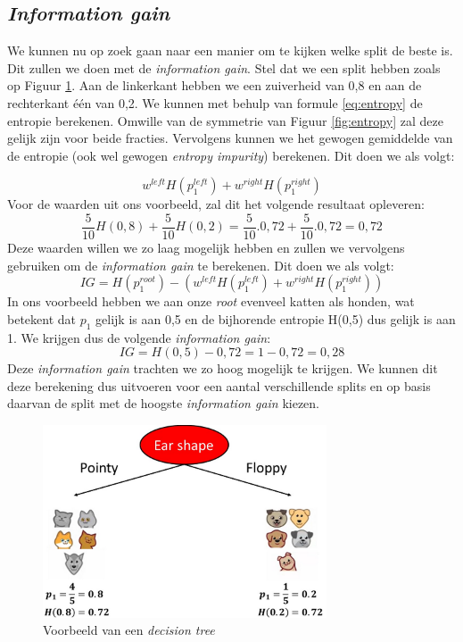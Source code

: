 \subsection{\textit{Information gain}}

We kunnen nu op zoek gaan naar een manier om te kijken welke split de beste is. Dit zullen we doen met de \textit{information gain}. Stel dat we een split hebben zoals op Figuur \ref{fig:decision-tree-split}. Aan de linkerkant hebben we een zuiverheid van 0,8 en aan de rechterkant één van 0,2. We kunnen met behulp van formule \ref{eq:entropy} de entropie berekenen. Omwille van de symmetrie van Figuur \ref{fig:entropy} zal deze gelijk zijn voor beide fracties. Vervolgens kunnen we het gewogen gemiddelde van de entropie (ook wel gewogen \textit{entropy impurity}) berekenen. Dit doen we als volgt:

\begin{equation}
	w^{left} H(p_{1}^{left}) + w^{right} H(p_{1}^{right})
\end{equation}
\noindent
Voor de waarden uit ons voorbeeld, zal dit het volgende resultaat opleveren:
\begin{equation}
	\frac{5}{10} H(0,8) + \frac{5}{10} H(0,2) = \frac{5}{10} . 0,72+ \frac{5}{10} . 0,72 = 0,72
\end{equation}
\noindent
Deze waarden willen we zo laag mogelijk hebben en zullen we vervolgens gebruiken om de \textit{information gain} te berekenen. Dit doen we als volgt:
\begin{equation}
	IG = H(p_{1}^{root}) - (w^{left} H(p_{1}^{left}) + w^{right} H(p_{1}^{right}))
\end{equation}
\noindent
In ons voorbeeld hebben we aan onze \textit{root} evenveel katten als honden, wat betekent dat $p_{1}$ gelijk is aan 0,5 en de bijhorende entropie H(0,5) dus gelijk is aan 1. We krijgen dus de volgende \textit{information gain}:
\begin{equation}
	IG = H(0,5) - 0,72 = 1 - 0,72 = 0,28
\end{equation}
\noindent
Deze \textit{information gain} trachten we zo hoog mogelijk te krijgen. We kunnen dit deze berekening dus uitvoeren voor een aantal verschillende splits en op basis daarvan de split met de hoogste \textit{information gain} kiezen. 

\begin{figure}[h]
	\centering
	\includegraphics[width=0.75\textwidth]{images/31-decision-tree-split.png}
	\caption{Voorbeeld van een \textit{decision tree}}
	\label{fig:decision-tree-split}
\end{figure}
\newpage
